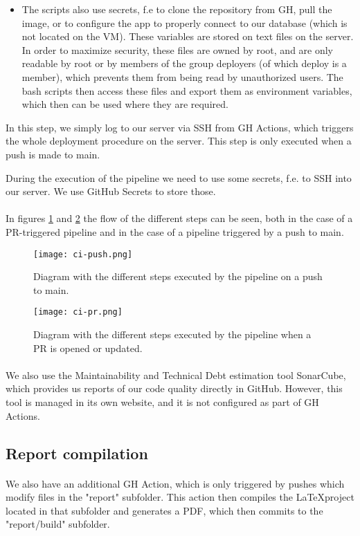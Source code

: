 \begin{enumerate}
\begin{itemize}
		\item The scripts also use secrets, f.e to clone the repository from GH, pull the image, or to configure the app to properly connect to our database (which is not located on the VM). These variables are stored on text files on the server. In order to maximize security, these files are owned by root, and are only readable by root or by members of the group deployers (of which deploy is a member), which prevents them from being read by unauthorized users. The bash scripts then access these files and export them as environment variables, which then can be used where they are required.
	\end{itemize}
	In this step, we simply log to our server via SSH from GH Actions, which triggers the whole deployment procedure on the server. This step is only executed when a push is made to main. 
\end{enumerate}
During the execution of the pipeline we need to use some secrets, f.e. to SSH into our server. We use GitHub Secrets to store those.

\paragraph{} In figures \ref{fig:ci-push} and \ref{fig:ci-pr} the flow of the different steps can be seen, both in the case of a PR-triggered pipeline and in the case of a pipeline triggered by a push to main.

\begin{figure}[h]
	\centering
	\texttt{[image: ci-push.png]}
	\caption{Diagram with the different steps executed by the pipeline on a push to main.}
	\label{fig:ci-push}
\end{figure}

\begin{figure}[h]
	\centering
	\texttt{[image: ci-pr.png]}
	\caption{Diagram with the different steps executed by the pipeline when a PR is opened or updated.}
	\label{fig:ci-pr}
\end{figure}

\paragraph{} We also use the Maintainability and Technical Debt estimation tool SonarCube, which provides us reports of our code quality directly in GitHub. However, this tool is managed in its own website, and it is not configured as part of GH Actions.

\subsection{Report compilation}
\paragraph{} We also have an additional GH Action, which is only triggered by pushes which modify files in the "report" subfolder. This action then compiles the \LaTeX project located in that subfolder and generates a PDF, which then commits to the "report/build" subfolder.